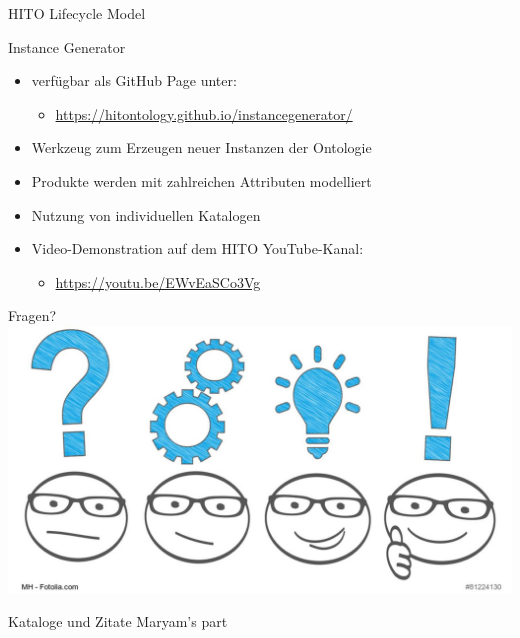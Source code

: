 \documentclass[aspectratio=1610,12pt]{beamer}
\begin{document}
\begin{frame}{HITO Lifecycle Model}
 \centering
  \vspace{-0.5cm}
\end{frame}

\begin{frame}{Instance Generator}
\begin{spacing}{1.25}
\begin{itemize}
\item verfügbar als GitHub Page unter:
\begin{itemize}
\item \url{https://hitontology.github.io/instancegenerator/}
\end{itemize}
\item Werkzeug zum Erzeugen neuer Instanzen der Ontologie
\item Produkte werden mit zahlreichen Attributen modelliert
\item Nutzung von individuellen Katalogen
\item Video-Demonstration auf dem HITO YouTube-Kanal:
\begin{itemize}
\item \url{https://youtu.be/EWvEaSCo3Vg}
\end{itemize}
\end{itemize}
\end{spacing}
\end{frame}

\begin{frame}{Fragen?}
  \centering
  \vspace{-0.5cm}
  \includegraphics[width=\textwidth]{img/fragen.png}
\end{frame}

\begin{frame}{Kataloge und Zitate}
  \centering
  \huge Maryam's part
\end{frame}
\end{document}
